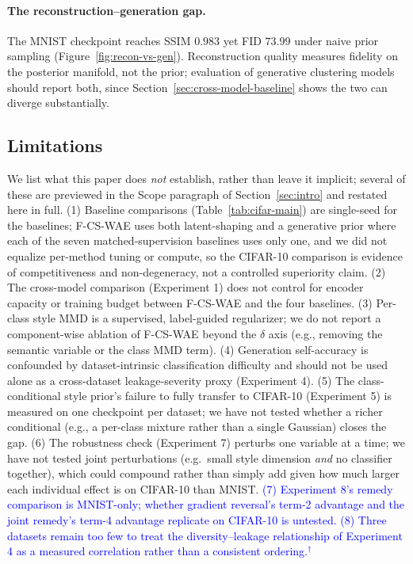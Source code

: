 \documentclass[10pt,letterpaper]{article}
\newcommand{\ours}{F-CS-WAE}
\newcommand{\pj}[1]{\textcolor{blue}{#1$^{\dagger}$}}
\begin{document}
\paragraph{The reconstruction--generation gap.}
The MNIST checkpoint reaches SSIM $0.983$ yet FID $73.99$ under naive prior
sampling (Figure~\ref{fig:recon-vs-gen}). Reconstruction quality measures
fidelity on the posterior manifold, not the prior; evaluation of generative
clustering models should report both, since Section~\ref{sec:cross-model-baseline}
shows the two can diverge substantially.

\subsection{Limitations}
\label{sec:limitations}

We list what this paper does \emph{not} establish, rather than leave it
implicit; several of these are previewed in the Scope paragraph of
Section~\ref{sec:intro} and restated here in full.
(1) Baseline comparisons
(Table~\ref{tab:cifar-main}) are single-seed for the baselines; \ours{} uses
both latent-shaping and a generative prior where each of the seven
matched-supervision baselines uses only one, and we did not equalize
per-method tuning or compute, so the CIFAR-10 comparison is evidence of
competitiveness and non-degeneracy, not a controlled superiority claim.
(2) The cross-model comparison (Experiment 1) does not control for encoder
capacity or training budget between \ours{} and the four baselines.
(3) Per-class style MMD is a supervised, label-guided regularizer; we do not
report a component-wise ablation of \ours{} beyond the $\delta$ axis (e.g.,
removing the semantic variable or the class MMD term). (4) Generation
self-accuracy is confounded by dataset-intrinsic classification difficulty
and should not be used alone as a cross-dataset leakage-severity proxy
(Experiment 4). (5) The class-conditional style prior's failure to fully
transfer to CIFAR-10 (Experiment 5) is measured on one checkpoint per
dataset; we have not tested whether a richer conditional (e.g., a per-class
mixture rather than a single Gaussian) closes the gap. (6) The robustness
check (Experiment 7) perturbs one variable at a time; we have not tested
joint perturbations (e.g.\ small style dimension \emph{and} no classifier
together), which could compound rather than simply add given how much larger
each individual effect is on CIFAR-10 than MNIST.
\pj{(7) Experiment 8's remedy comparison is MNIST-only; whether gradient
reversal's term-2 advantage and the joint remedy's term-4 advantage
replicate on CIFAR-10 is untested. (8) Three datasets remain too few to
treat the diversity--leakage relationship of Experiment 4 as a measured
correlation rather than a consistent ordering.}
\end{document}
